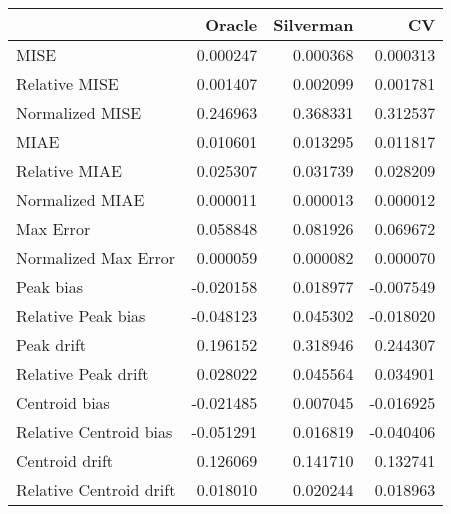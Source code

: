 \begin{tabular}{lrrr}
  \hline
 & Oracle & Silverman & CV \\ 
  \hline
MISE & 0.000247 & 0.000368 & 0.000313 \\ 
  Relative MISE & 0.001407 & 0.002099 & 0.001781 \\ 
  Normalized MISE & 0.246963 & 0.368331 & 0.312537 \\ 
  MIAE & 0.010601 & 0.013295 & 0.011817 \\ 
  Relative MIAE & 0.025307 & 0.031739 & 0.028209 \\ 
  Normalized MIAE & 0.000011 & 0.000013 & 0.000012 \\ 
  Max Error & 0.058848 & 0.081926 & 0.069672 \\ 
  Normalized Max Error & 0.000059 & 0.000082 & 0.000070 \\ 
  Peak bias & -0.020158 & 0.018977 & -0.007549 \\ 
  Relative Peak bias & -0.048123 & 0.045302 & -0.018020 \\ 
  Peak drift & 0.196152 & 0.318946 & 0.244307 \\ 
  Relative Peak drift & 0.028022 & 0.045564 & 0.034901 \\ 
  Centroid bias & -0.021485 & 0.007045 & -0.016925 \\ 
  Relative Centroid bias & -0.051291 & 0.016819 & -0.040406 \\ 
  Centroid drift & 0.126069 & 0.141710 & 0.132741 \\ 
  Relative Centroid drift & 0.018010 & 0.020244 & 0.018963 \\ 
   \hline
\end{tabular}
